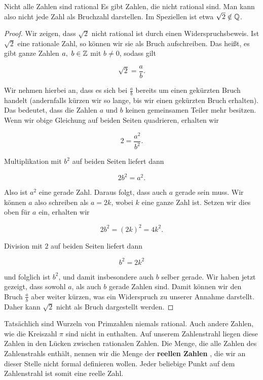 \documentclass[../../main.tex]{subfiles}
\begin{document}
	\begin{theorem}{Nicht alle Zahlen sind rational}
		Es gibt Zahlen, die nicht rational sind. Man kann also nicht jede Zahl als Bruchzahl darstellen. Im Speziellen ist etwa $\sqrt{2} \notin\mathbb{Q}$.
	\end{theorem}
	
	\begin{proof}
		Wir zeigen, dass $\sqrt{2}$ nicht rational ist durch einen Widerspruchsbeweis. Ist $\sqrt{2}$ eine rationale Zahl, so können wir sie als Bruch aufschreiben. Das heißt, es gibt ganze Zahlen $a, \ b\in\Integer$ mit $b \neq 0$, sodass gilt
		
		$$\sqrt{2} = \frac{a}{b}.$$
		
		Wir nehmen hierbei an, dass es sich bei $\frac{a}{b}$ bereits um einen gekürzten Bruch handelt (andernfalls kürzen wir so lange, bis wir einen gekürzten Bruch erhalten). Das bedeutet, dass die Zahlen $a$ und $b$ keinen gemeinsamen Teiler mehr besitzen. Wenn wir obige Gleichung auf beiden Seiten quadrieren, erhalten wir
		
		$$2 = \frac{a^2}{b^2}.$$
		
		Multiplikation mit $b^2$ auf beiden Seiten liefert dann
		
		$$2b^2 = a^2.$$ 
		
		Also ist $a^2$ eine gerade Zahl. Daraus folgt, dass auch $a$ gerade sein muss. Wir können $a$ also schreiben als 
		$a = 2k$, wobei $k$ eine ganze Zahl ist. Setzen wir dies oben für $a$ ein, erhalten wir
		
		$$2b^2 = \left(2k\right)^2 = 4k^2.$$
		
		Division mit $2$ auf beiden Seiten liefert dann
		
		$$b^2 = 2k^2$$
		
		und folglich ist $b^2$, und damit insbesondere auch $b$ selber gerade. Wir haben jetzt gezeigt, dass sowohl $a$, als auch $b$ gerade Zahlen sind. Damit können wir den Bruch $\frac{a}{b}$ aber weiter kürzen, was ein Widerspruch zu unserer Annahme darstellt. Daher kann $\sqrt{2}$ nicht als Bruch dargestellt werden.
	\end{proof}

	Tatsächlich sind Wurzeln von Primzahlen niemals rational. Auch andere Zahlen, wie die Kreiszahl $\pi$ sind nicht in \Rational enthalten. Auf unserem Zahlenstrahl liegen diese Zahlen in den Lücken zwischen rationalen Zahlen. Die Menge, die alle Zahlen des Zahlenstrahls enthält, nennen wir die Menge der \textbf{reellen Zahlen} \Real, die wir an dieser Stelle nicht formal definieren wollen. Jeder beliebige Punkt auf dem Zahlenstrahl ist somit eine reelle Zahl.
	
\end{document}
